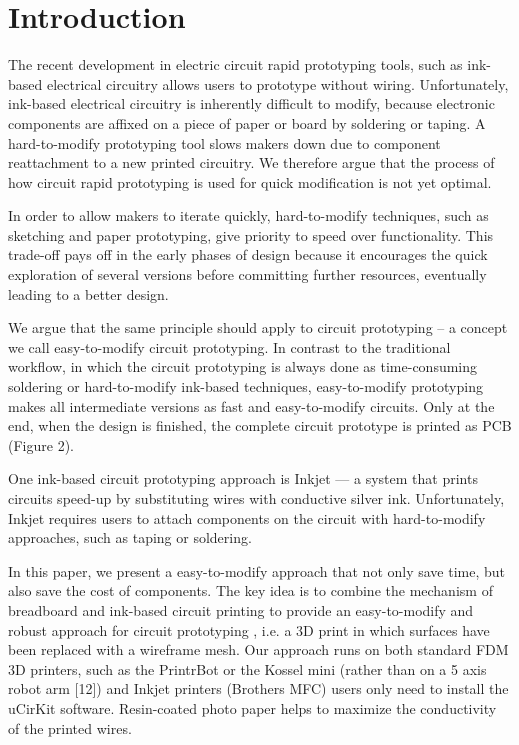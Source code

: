 \section{Introduction}

The recent development in electric circuit rapid prototyping tools, such as ink-based electrical circuitry allows users to prototype without wiring. Unfortunately, ink-based electrical circuitry is inherently difficult to modify, because electronic components are affixed on a piece of paper or board by soldering or taping. A hard-to-modify prototyping tool slows makers down due to component reattachment to a new printed circuitry. We therefore argue that the process of how circuit rapid prototyping is used for quick modification is not yet optimal.

In order to allow makers to iterate quickly, hard-to-modify techniques, such as sketching and paper prototyping, give priority to speed over functionality. This trade-off pays off in the early phases of design because it encourages the quick exploration of several versions before committing further resources, eventually leading to a better design.

We argue that the same principle should apply to circuit prototyping – a concept we call easy-to-modify circuit prototyping. In contrast to the traditional workflow, in which the circuit prototyping is always done as time-consuming soldering or hard-to-modify ink-based techniques, easy-to-modify prototyping makes all intermediate versions as fast and easy-to-modify circuits. Only at the end, when the design is finished, the complete circuit prototype is printed as PCB (Figure 2).

One ink-based circuit prototyping approach is Inkjet — a system that prints circuits speed-up by substituting wires with conductive silver ink. Unfortunately, Inkjet requires users to attach components on the circuit with hard-to-modify approaches, such as taping or soldering.

In this paper, we present a easy-to-modify approach that not only save time, but also save the cost of components. The key idea is to combine the mechanism of breadboard and ink-based circuit printing to provide an easy-to-modify and robust approach for circuit prototyping , i.e. a 3D print in which surfaces have been replaced with a wireframe mesh. Our approach runs on both standard FDM 3D printers, such as the PrintrBot or the Kossel mini (rather than on a 5 axis robot arm [12]) and Inkjet printers (Brothers MFC) users only need to install the uCirKit software. Resin-coated photo paper helps to maximize the conductivity of the printed wires.

